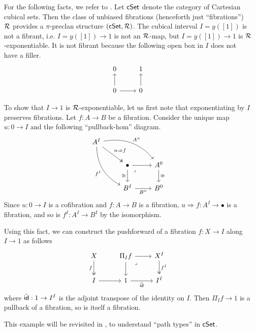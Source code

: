 \begin{example}
  \label{ex:cSet-unbiased-fibrations}
  For the following facts, we refer to \cite{awodey2026cartesian}.
  Let $\mathsf{cSet}$ denote the category of Cartesian cubical sets.
  Then the class of unbiased fibrations (henceforth just ``fibrations'')
  $\mathcal{R}$ provides a $\pi$-preclan structure
  $(\mathsf{cSet},\mathcal{R})$.
  The cubical interval $I = y([1])$ is not a fibrant,
  i.e. $I = y([1]) \to 1$ is not an $\mathcal{R}$-map,
  but $I = y([1]) \to 1$ is $\mathcal{R}$-exponentiable.
  It is not fibrant because the following open box in $I$ does not have a filler.
  \[ \begin{tikzcd}
    0 & 1 \\
    0 & 0
    \arrow[from=2-1, to=1-1]
    \arrow[from=2-1, to=2-2]
    \arrow[from=2-2, to=1-2]
  \end{tikzcd} \]

  To show that $I \to 1$ is $\mathcal{R}$-exponentiable,
  let us first note that exponentiating by $I$ preserves fibrations.
  Let $f : A \to B$ be a fibration.
  Consider the unique map $u : 0 \to I$
  and the following ``pullback-hom'' diagram.
  \[\begin{tikzcd}
    {A^I} && \\
    & \bullet & {A^0} \\
    & {B^I} & {B^0}
    \arrow["{u \Rightarrow f}", two heads, from=1-1, to=2-2]
    \arrow["{A^u}", bend left, from=1-1, to=2-3]
    \arrow["{f^I}"', bend right, from=1-1, to=3-2]
    \arrow[from=2-2, to=2-3]
    \arrow["\iso"', from=2-2, to=3-2]
    \arrow["\lrcorner"{anchor=center, pos=0.125}, draw=none, from=2-2, to=3-3]
    \arrow["\iso", from=2-3, to=3-3]
    \arrow["{B^u}"', from=3-2, to=3-3]
  \end{tikzcd}\]
  Since $u : 0 \to I$ is a cofibration and $f : A \to B$ is a fibration,
  $u \Rightarrow f : A^I \to \bullet$ is a fibration,
  and so is $f^I : A^I \to B^I$ by the isomorphism.

  Using this fact,
  we can construct the pushforward of a fibration $f : X \to I$
  along $I \to 1$ as follows
  \[ \begin{tikzcd}
    X & {\Pi_I f} & {X^I} \\
    I & 1 & {I^I}
    \arrow["f"', two heads, from=1-1, to=2-1]
    \arrow[from=1-2, to=1-3]
    \arrow[from=1-2, to=2-2]
    \arrow["\lrcorner"{anchor=center, pos=0.125}, draw=none, from=1-2, to=2-3]
    \arrow["{f^I}", two heads, from=1-3, to=2-3]
    \arrow[from=2-1, to=2-2]
    \arrow["{\tilde{\id}}"', from=2-2, to=2-3]
  \end{tikzcd}\]
  where $\tilde{\mathsf{id}} : 1 \to I^I$ is the adjoint transpose 
  of the identity on $I$.
  Then $\Pi_I f \to 1$ is a pullback of a fibration,
  so is itself a fibration.

  This example will be revisited in ,
  to understand ``path types'' in $\mathsf{cSet}$.
\end{example}

